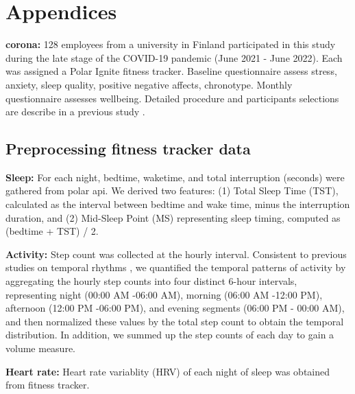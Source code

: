 \documentclass[pdflatex,sn-vancouver,Numbered]{bst/sn-jnl}%
\theoremstyle{thmstyleone}%
\theoremstyle{thmstyletwo}%
\theoremstyle{thmstylethree}%
\begin{document}
\section{Appendices}
\begin{appendices}


\textbf{corona:} 128 employees from a university in Finland participated in this study during the late stage of the COVID-19 pandemic (June 2021 - June 2022). Each was assigned a Polar Ignite fitness tracker. Baseline questionnaire assess stress, anxiety, sleep quality, positive negative affects, chronotype. Monthly questionnaire assesses wellbeing. Detailed procedure and participants selections are describe in a previous study \cite{luong2023impact}.


\subsection*{Preprocessing fitness tracker data}

\textbf{Sleep:} For each night, bedtime, waketime, and total interruption (seconds) were gathered from polar api. We derived two features: (1) Total Sleep Time (TST), calculated as the interval between bedtime and wake time, minus the interruption duration, and (2) Mid-Sleep Point (MS) representing sleep timing, computed as (bedtime + TST) / 2. 

\textbf{Activity:} Step count was collected at the hourly interval. Consistent to previous studies on temporal rhythms \cite{luong2023impact, aledavoodDigitalDailyCycles2015, aledavoodDailyRhythmsMobile2015a}, we quantified the temporal patterns of activity by aggregating the hourly step counts into four distinct 6-hour intervals, representing night (00:00 AM -06:00 AM), morning (06:00 AM -12:00 PM), afternoon (12:00 PM -06:00 PM), and evening segments (06:00 PM - 00:00 AM), and then normalized these values by the total step count to obtain the temporal distribution. In addition, we summed up the step counts of each day to gain a volume measure.

\textbf{Heart rate:} Heart rate variablity (HRV) of each night of sleep was obtained from fitness tracker.


\end{appendices}


\end{document}
